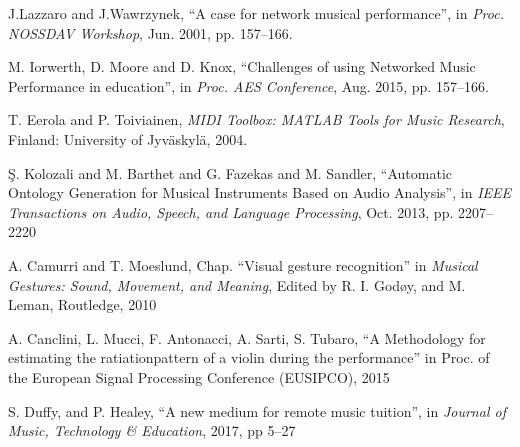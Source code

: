 
J.Lazzaro and J.Wawrzynek, ``A case for network musical performance'', in \emph{Proc. NOSSDAV Workshop}, Jun. 2001, pp. 157--166. 


M. Iorwerth, D. Moore and D. Knox, ``Challenges of using Networked Music Performance in education'', in  \emph{Proc. AES Conference}, Aug. 2015, pp. 157--166. 


T. Eerola and P. Toiviainen, \emph{MIDI Toolbox: MATLAB Tools for Music Research}, Finland: University of Jyv{\"a}skyl{\"a},  2004.

\c{S}. Kolozali and M. Barthet and G. Fazekas and M. Sandler, ``Automatic Ontology Generation for Musical Instruments Based on Audio Analysis'', in \emph{IEEE Transactions on Audio, Speech, and Language Processing}, Oct. 2013, pp. {2207--2220}

A. Camurri and T. Moeslund, Chap. ``Visual gesture recognition'' in \emph{Musical Gestures: Sound, Movement, and Meaning}, Edited by R. I. God{\o}y, and M. Leman, Routledge, 2010

A. Canclini, L. Mucci, F. Antonacci, A. Sarti, S. Tubaro, ``A Methodology for estimating the ratiationpattern of a violin during the performance'' in Proc. of the European Signal Processing Conference (EUSIPCO), 2015

S. Duffy, and P. Healey, ``A new medium for remote music tuition'', in \emph{Journal of Music, Technology \& Education}, 2017, pp 5--27

%	
%	
%	
%	
%	
%	
